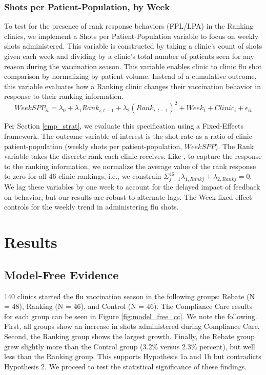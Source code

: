  \subsubsection{Shots per Patient-Population, by Week}
 To test for the presence of rank response behaviors (FPL/LPA) in the Ranking clinics, we implement a Shots per Patient-Population variable to focus on weekly shots administered. This variable is constructed by taking a clinic’s count of shots given each week and dividing by a clinic’s total number of patients seen for any reason during the vaccination season. This variable enables clinic to clinic flu shot comparison by normalizing by patient volume. Instead of a cumulative outcome, this variable evaluates how a Ranking clinic changes their vaccination behavior in response to their ranking information. 
 \begin{equation} \label{rank_resp} %
       WeekSPP_{it} = \lambda_0 + \lambda_1 Rank_{i,t-1} + \lambda_2 (Rank_{i,t-1})^2 + Week_t + Clinic_i + \epsilon_{it}
 \end{equation} 
 
 Per Section \ref{emp_strat}, we evaluate this specification using a Fixed-Effects framework. The outcome variable of interest is the shot rate as a ratio of clinic patient-population (weekly shots per patient-population, $WeekSPP$). The Rank variable takes the discrete rank each clinic receives. Like \cite{Gill2019}, to capture the response to the ranking information, we normalize the average value of the rank response to zero for all 46 clinic-rankings, i.e., we constrain $ \Sigma^{46}_{j=1} \lambda_{1,Rank j} + \lambda_{2,Rank j} = 0$. We lag these variables by one week to account for the delayed impact of feedback on behavior, but our results are robust to alternate lags. The Week fixed effect controls for the weekly trend in administering flu shots.
 
\section{Results} \label{Results_CC}
 \subsection{Model-Free Evidence}
 140 clinics started the flu vaccination season in the following groups: Rebate (N = 48), Ranking (N = 46), and Control (N = 46).  The Compliance Care results for each group can be seen in Figure \ref{fig:model_free_cc}. We note the following. First, all groups show an increase in shots administered during Compliance Care. Second, the Ranking group shows the largest growth. Finally, the Rebate group grew slightly more than the Control group (3.2\% versus 2.3\% percent), but well less than the Ranking group. This supports Hypothesis 1a and 1b but contradicts Hypothesis 2. We proceed to test the statistical significance of these findings.
 
